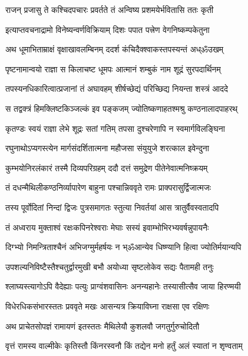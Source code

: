 \twolineshloka
{राजन् प्रजासु ते कश्चिदपचारः प्रवर्तते}
{तं अन्विष्य प्रशमयेर्भवितासि ततः कृती}%

\twolineshloka
{इत्याप्तवचनाद्रामो विनेष्यन्वर्णविक्रियाम्}
{दिशः पपात पत्त्रेण वेगनिष्कम्पकेतुना}%

\twolineshloka
{अथ धूमाभिताम्राक्षं वृक्षाखावलम्बिनम्}
{ददर्श कंचिदैक्श्वाकस्तपस्यन्तं अध्ॐउखम्}%

\twolineshloka
{पृष्टनामान्वयो राज्ञा स किलाचष्ट धूमपः}
{आत्मानं शम्बुकं नाम शूद्रं सुरपदार्थिनम्}%

\twolineshloka
{तपस्यनधिकारित्वात्प्रजानां तं अघावहम्}
{शीर्षच्छेद्यं परिच्छिद्य नियन्ता शस्त्रं आददे}%

\twolineshloka
{स तद्वक्त्रं हिमक्लिष्टकिञ्जल्कं इव पङ्कजम्}
{ज्योतिष्कणाहतश्मश्रु कण्ठनालादपाहरथ्}%

\twolineshloka
{कृतण्डः स्वयं राज्ञा लेभे शूद्रः सतां गतिम्}
{तपसा दुश्चरेणापि न स्वमार्गविलङ्घिना}%

\twolineshloka
{रघुनाथोऽप्यगस्त्येन मार्गसंदर्शितात्मना}
{महौजसा संयुयुजे शरत्काल इवेन्दुना}%

\twolineshloka
{कुम्भयोनिरलंकारं तस्मै दिव्यपरिग्रहम्}
{ददौ दत्तं समुद्रेण पीतेनेवात्मनिष्क्रयम्}%

\twolineshloka
{तं दधन्मैथिलीकण्ठनिर्व्यापारेण बाहुना}
{पश्चान्निववृते रामः प्राक्परासुर्द्विजात्मजः}%

\twolineshloka
{तस्य पूर्वोदितां निन्दां द्विजः पुत्रसमागतः}
{स्तुत्या निवर्तयां आस त्रातुर्वैवस्वतादपि}%

\twolineshloka
{तं अध्वराय मुक्ताश्वं रक्षःकपिनरेश्वराः}
{मेघाः सस्यं इवाम्भोभिरभ्यवर्षन्नुपायनैः}%

\twolineshloka
{दिग्भ्यो निमन्त्रिताश्चैनं अभिजग्मुर्महर्षयः}
{न भ्ॐआन्येव धिष्ण्यानि हित्वा ज्योतिर्मयान्यपि}%

\twolineshloka
{उपशल्यनिविष्टैस्तैश्चतुर्द्वारमुखी बभौ}
{अयोध्या सृष्टलोकेव सद्यः पैतामही तनुः}%

\twolineshloka
{श्लाघ्यस्त्यागोऽपि वैदेह्याः पत्युः प्राग्वंशवासिनः}
{अनन्यहानेः तस्यासीत्सैव जाया हिरण्मयी}%

\twolineshloka
{विधेरधिकसंभारस्ततः प्रववृते मखः}
{आसन्यत्र क्रियाविघ्ना राक्षसा एव रक्षिणः}%

\twolineshloka
{अथ प्राचेतसोपज्ञं रामायणं इतस्ततः}
{मैथिलेयौ कुशलवौ जगतुर्गुरुचोदितौ}%

\twolineshloka
{वृत्तं रामस्य वाल्मीकेः कृतिस्तौ किंनरस्वनौ}
{किं तद्येन मनो हर्तुं अलं स्यातां न शृण्वताम्}%

